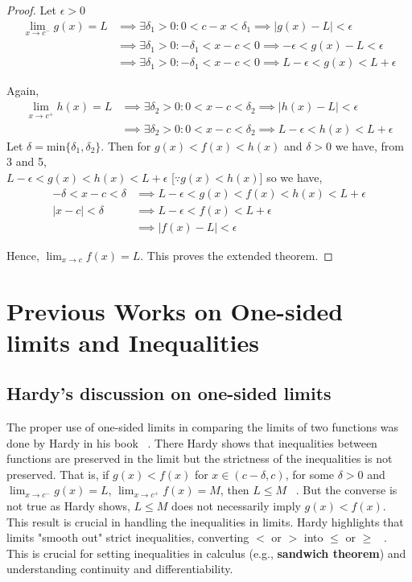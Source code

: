 \documentclass[a4paper,twoside,12pt]{article}
\theoremstyle{plain}
\theoremstyle{definition}
\theoremstyle{theorem}
\begin{document}
{ \begin{proof}

 Let \(\epsilon > 0\)
 \begin{align}
   \lim_{x \to c^-} g(x) = L & \implies \exists {\delta}_1 >0 : 0<c-x< \delta_1 \implies |g(x)-L|< \epsilon \\
                             &\implies \exists {\delta}_1 >0 : -\delta_1 <x-c< 0 \implies -\epsilon < g(x)-L< \epsilon \\
   &\implies \exists {\delta}_1 >0 : -\delta_1 <x-c< 0 \implies L -\epsilon < g(x)< L  + \epsilon
 \end{align}

 Again,
 \begin{align}
   \lim_{x \to c^+} h(x) =L & \implies \exists {\delta}_2 >0 : 0<x-c<\delta_2 \implies |h(x)-L|< \epsilon \\
   & \implies \exists {\delta}_2 >0 : 0<x-c<\delta_2 \implies L -\epsilon < h(x)< L  + \epsilon
 \end{align}
 Let \(\delta = \text{min}\{\delta_1, \delta_2\}\). Then for \(g(x) < f(x) < h(x)\) and \(\delta >0\) we have, from 3 and 5, \\
 \(L -\epsilon < g(x) < h(x)< L  + \epsilon \) [\(\because g(x) < h(x)\)] so we have,
 \begin{align}
-\delta < x-c < \delta & \implies   L -\epsilon < g(x) < f(x) < h(x)< L  + \epsilon \\
  |x-c| < \delta & \implies L -\epsilon < f(x)< L  + \epsilon \\
   & \implies |f(x) -L| < \epsilon
 \end{align}

 Hence, $\displaystyle \lim_{x \to c} f(x)=L$. This proves the extended theorem.
\end{proof}

\setcounter{thm}{2}

\section{Previous Works on One-sided limits and Inequalities}
\subsection{Hardy's discussion on one-sided limits}
The proper use of one-sided limits in comparing the limits of two functions was done by Hardy in his book ~\cite{hardy}. There Hardy shows that inequalities between functions are preserved in the limit but the strictness of the inequalities is not preserved. That is, if $g(x) < f(x)$ for $x \in (c-\delta ,c )$, for some $\delta >0$ and $\lim_{x \to c^-} g(x) = L$, $\lim_{x \to c^+} f(x) =M$, then $L \leq M$ ~\cite{hardy}. But the converse is not true as Hardy shows, $L \leq M$ does not necessarily imply $g(x) < f(x)$. \\[2mm]
This result is crucial in handling the inequalities in limits. Hardy highlights that limits "smooth out" strict inequalities, converting $<$ or $>$ into $\leq$ or $\geq$ ~\cite{hardy}. This is crucial for setting inequalities in calculus (e.g., \textbf{sandwich theorem}) and understanding continuity and differentiability.

}
\end{document}
